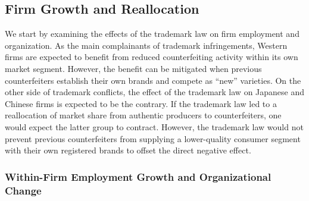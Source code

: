 \documentclass[12pt]{article}
\begin{document}
\subsection{Firm Growth and Reallocation}

We start by examining the effects of the trademark law on  firm employment and organization. As the main complainants of trademark infringements, Western firms are expected to benefit from reduced counterfeiting activity within its own market segment. However, the benefit can be mitigated when previous counterfeiters establish their own brands and compete as ``new'' varieties. On the other side of trademark conflicts, the effect of the trademark law on Japanese and Chinese firms is expected to be the contrary. If the trademark law led to a reallocation of market share from authentic producers to counterfeiters, one would expect the latter group to contract. However, the trademark law would not prevent previous counterfeiters from supplying a lower-quality consumer segment with their own registered brands to offset the direct negative effect.

\subsubsection{Within-Firm Employment Growth and Organizational Change}



\end{document}
